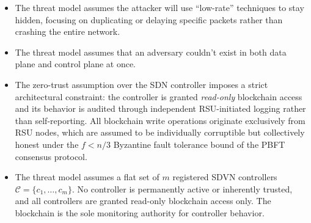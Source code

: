 \documentclass[12pt, a4paper]{report}
\begin{document}
\begin{itemize}
  \item The threat model assumes the attacker will use ``low-rate'' techniques to stay hidden, focusing on duplicating or delaying specific packets rather than crashing the entire network.
  \item The threat model assumes that an adversary couldn't exist in both data plane and control plane at once.
  \item The zero-trust assumption over the SDN controller imposes a strict
architectural constraint: the controller is granted \emph{read-only}
blockchain access and its behavior is audited through independent
RSU-initiated logging rather than self-reporting. All blockchain
write operations originate exclusively from RSU nodes, which are
assumed to be individually corruptible but collectively honest under
the $f < n/3$ Byzantine fault tolerance bound of the PBFT consensus
protocol.

  \item The threat model assumes a flat set of $m$ registered \ac{SDVN}
  controllers $\mathcal{C}=\{c_1,\ldots,c_m\}$. No controller is
  permanently active or inherently trusted, and all controllers are
  granted read-only blockchain access only. The blockchain is the sole
  monitoring authority for controller behavior.


  
\end{itemize}
\end{document}
